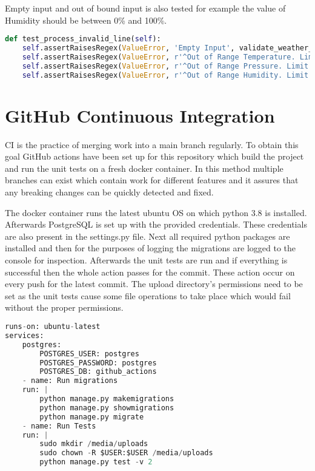 Empty input and out of 
bound input is also tested for example the value of Humidity should be between 0\% and 100\%.

\begin{lstlisting}[language={Python}]
def test_process_invalid_line(self):
	self.assertRaisesRegex(ValueError, 'Empty Input', validate_weather_line, '')
	self.assertRaisesRegex(ValueError, r'^Out of Range Temperature. Limit is 50.00C to -50.00C$',validate_weather_line, 'temperature: -1000.34C, pressure: 1114.18hPa, humidity:  92.09%, time: 2021-02-20T00:00:31.451')
	self.assertRaisesRegex(ValueError, r'^Out of Range Pressure. Limit is 1000.00hPa to 1500.00hPa$', validate_weather_line, 'temperature: -1.34C, pressure: 5000.18hPa, humidity:  92.09%, time: 2021-02-20T00:00:31.451')
	self.assertRaisesRegex(ValueError, r'^Out of Range Humidity. Limit is 0.00% to 100.00%$', validate_weather_line, 'temperature: -1.34C, pressure: 1114.18hPa, humidity:  101.00%, time: 2021-02-20T00:00:31.451')
\end{lstlisting}

\section{GitHub Continuous Integration}
CI is the practice of merging work into a main branch regularly. To obtain this
goal GitHub actions have been set up for this repository which build the project
and run the unit tests on a fresh docker container. In this method multiple branches
can exist which contain work for different features and it assures that any breaking changes
can be quickly detected and fixed.

The docker container runs the latest ubuntu OS on which python 3.8 is installed.
Afterwards PostgreSQL is set up with the provided credentials. These credentials are
also present in the settings.py file. Next all required python packages are installed and then
for the purposes of logging the migrations are logged to the console for inspection. Afterwards
the unit tests are run and if everything is successful then the whole action passes for the commit.
These action occur on every push for the latest commit. The upload directory's permissions need to be
set as the unit tests cause some file operations to take place which would fail without the proper
permissions.

\begin{lstlisting}[language={Python}]
runs-on: ubuntu-latest
services:
	postgres:
		POSTGRES_USER: postgres
		POSTGRES_PASSWORD: postgres
		POSTGRES_DB: github_actions
	- name: Run migrations
	run: |
		python manage.py makemigrations
		python manage.py showmigrations
		python manage.py migrate
	- name: Run Tests
	run: |
		sudo mkdir /media/uploads
		sudo chown -R $USER:$USER /media/uploads
		python manage.py test -v 2
\end{lstlisting}

